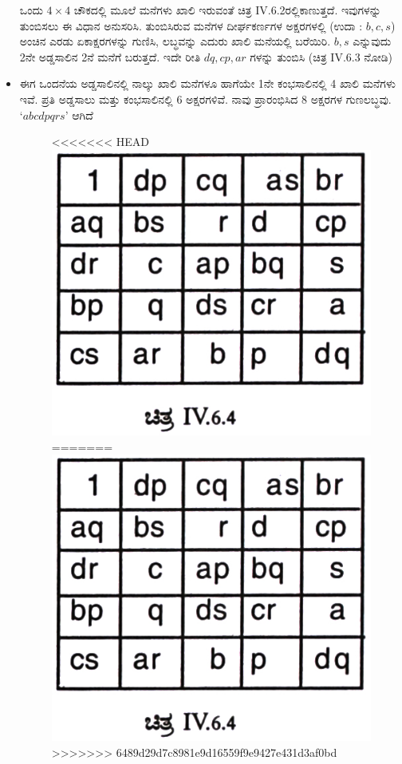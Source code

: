 \begin{itemize}
	ಒಂದು $4 \times 4$ ಚೌಕದಲ್ಲಿ ಮೂಲೆ ಮನೆಗಳು ಖಾಲಿ ಇರುವಂತೆ ಚಿತ್ರ IV.6.2ರಲ್ಲಿ\break ಕಾಣುತ್ತದೆ. ಇವುಗಳನ್ನು ತುಂಬಿಸಲು ಈ ವಿಧಾನ ಅನುಸರಿಸಿ. ತುಂಬಿಸಿರುವ ಮನೆಗಳ ದೀರ್ಘಕರ್ಣಗಳ ಅಕ್ಷರಗಳಲ್ಲಿ (ಉದಾ : $b, c, s$) ಅಂಚಿನ ಎರಡು ಏಕಾಕ್ಷರ\-ಗಳನ್ನು ಗುಣಿಸಿ, ಲಬ್ಧವನ್ನು ಎದುರು ಖಾಲಿ ಮನೆಯಲ್ಲಿ ಬರೆಯಿರಿ. $b, s$ ಎನ್ನುವುದು 2ನೇ ಅಡ್ಡಸಾಲಿನ 2ನೆ ಮನೆಗೆ ಬರುತ್ತದೆ. ಇದೇ ರೀತಿ $dq, cp, ar$ ಗಳನ್ನು ತುಂಬಿಸಿ (ಚಿತ್ರ IV.6.3 ನೋಡಿ)
	\item ಈಗ ಒಂದನೆಯ ಅಡ್ಡಸಾಲಿನಲ್ಲಿ ನಾಲ್ಕು ಖಾಲಿ ಮನೆಗಳೂ ಹಾಗೆಯೇ 1ನೇ ಕಂಭಸಾಲಿನಲ್ಲಿ 4 ಖಾಲಿ ಮನೆಗಳು ಇವೆ. ಪ್ರತಿ ಅಡ್ಡಸಾಲು ಮತ್ತು ಕಂಭಸಾಲಿನಲ್ಲಿ 6 ಅಕ್ಷರ\-ಗಳಿವೆ. ನಾವು ಪ್ರಾರಂಭಿಸಿದ 8 ಅಕ್ಷರಗಳ ಗುಣಲಬ್ಧವು. $‘abcdpqrs’$ ಆಗಿದೆ
	\begin{figure}[H]
<<<<<<< HEAD
	\includegraphics{src/figures/chap7/fig7-29.jpg}
=======
	\includegraphics[scale=0.75]{src/figures/chap7/fig7.29.jpg}
>>>>>>> 6489d29d7c8981e9d16559f9e9427e431d3af0bd
	\end{figure}


\end{itemize}
